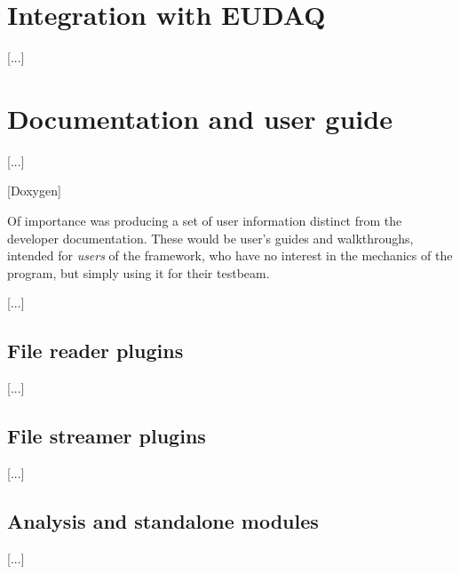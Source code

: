 \section{Integration with EUDAQ}
[...]

\section{Documentation and user guide}
[...]

[Doxygen]

Of importance was producing a set of user information distinct from the developer documentation. These would be user's guides and walkthroughs, intended for \emph{users} of the framework, who have no interest in the mechanics of the program, but simply using it for their testbeam.

[...]

\subsection{File reader plugins}
[...]

\subsection{File streamer plugins}
[...]

\subsection{Analysis and standalone modules}
[...]
